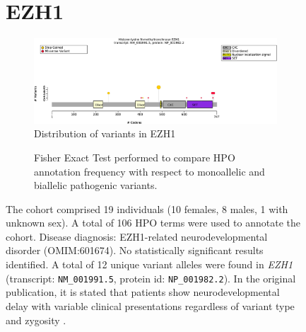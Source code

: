 \begin{figure}[htbp]
\section*{EZH1}
\centering
\begin{subfigure}[b]{0.95\textwidth}
\centering
\includegraphics[width=\textwidth]{ img/EZH1_protein_diagram.pdf} 
\captionsetup{justification=raggedright,singlelinecheck=false}
\caption{Distribution of variants in EZH1}
\end{subfigure}

\vspace{2em}

\begin{subfigure}[b]{0.95\textwidth}
\centering
{}
\captionsetup{justification=raggedright,singlelinecheck=false}
\caption{Fisher Exact Test performed to compare HPO annotation frequency with respect to monoallelic and biallelic pathogenic variants. }
\end{subfigure}

\vspace{2em}

\caption{The cohort comprised 19 individuals (10 females, 8 males, 1 with unknown sex). A total of 106 HPO terms were used to annotate the cohort. Disease diagnosis: EZH1-related neurodevelopmental disorder (OMIM:601674). No statistically significant results identified. A total of 12 unique variant alleles were found in \textit{EZH1} (transcript: \texttt{NM\_001991.5}, protein id: \texttt{NP\_001982.2}). In the original publication, it is stated that patients show neurodevelopmental delay with variable clinical presentations regardless of variant type and zygosity \cite{PMID_37433783}.}
\end{figure}
